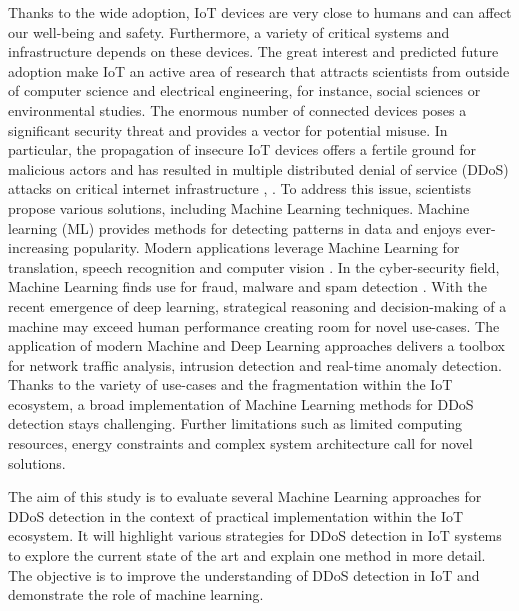 \documentclass[conference, 11pt]{IEEEtran}
\begin{document}
    Thanks to the wide adoption, IoT devices are very close to humans and can affect our well-being and safety.
    Furthermore, a variety of critical systems and infrastructure depends on these devices.
    The great interest and predicted future adoption make IoT an active area of research that attracts scientists from outside of computer science and electrical engineering, for instance, social sciences or environmental studies.
    The enormous number of connected devices poses a significant security threat and provides a vector for potential misuse.
    In particular, the propagation of insecure IoT devices offers a fertile ground for malicious actors and has resulted in multiple distributed denial of service (DDoS) attacks on critical internet infrastructure \cite{article:16}, \cite{article:8}.
    To address this issue, scientists propose various solutions, including Machine Learning techniques.
    Machine learning (ML) provides methods for detecting patterns in data and enjoys ever-increasing popularity.
    Modern applications leverage Machine Learning for translation, speech recognition and computer vision \cite{Goodfellow-et-al-2016}.
    In the cyber-security field, Machine Learning finds use for fraud, malware and spam detection \cite{article:18}.
    With the recent emergence of deep learning, strategical reasoning and decision-making of a machine may exceed human performance creating room for novel use-cases.
    The application of modern Machine and Deep Learning approaches delivers a toolbox for network traffic analysis, intrusion detection and real-time anomaly detection.
    Thanks to the variety of use-cases and the fragmentation within the IoT ecosystem, a broad implementation of Machine Learning methods for DDoS detection stays challenging.
    Further limitations such as limited computing resources, energy constraints and complex system architecture call for novel solutions.

    The aim of this study is to evaluate several Machine Learning approaches for DDoS detection in the context of practical implementation within the IoT ecosystem.
    It will highlight various strategies for DDoS detection in IoT systems to explore the current state of the art and explain one method in more detail.
    The objective is to improve the understanding of DDoS detection in IoT and demonstrate the role of machine learning.
\end{document}
